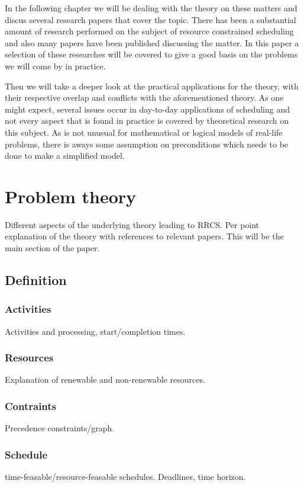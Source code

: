 \documentclass{article}
\begin{document}
In the following chapter we will be dealing with the theory on these matters and discus several research papers that cover the topic. There has been a substantial amount of research performed on the subject of resource constrained scheduling and also many papers have been published discussing the matter. In this paper a selection of these researches will be covered to give a good basis on the problems we will come by in practice.

Then we will take a deeper look at the practical applications for the theory, with their respective overlap and conflicts with the aforementioned theory. As one might expect, several issues occur in day-to-day applications of scheduling and not every aspect that is found in practice is covered by theoretical research on this subject. As is not unusual for mathematical or logical models of real-life problems, there is aways some assumption on preconditions which needs to be done to make a simplified model.


\newpage

\section{Problem theory}

Different aspects of the underlying theory leading to RRCS.  Per point explanation of the theory with references to relevant papers. This will be the main section of the paper.

\subsection{Definition}
\subsubsection{Activities}
Activities and processing, start/completion times. 
\subsubsection{Resources}
Explanation of renewable and non-renewable resources.
\subsubsection{Contraints}
Precedence constraints/graph. 
\subsubsection{Schedule}
time-feasable/resource-feasable schedules. Deadlines, time horizon.
\end{document}
